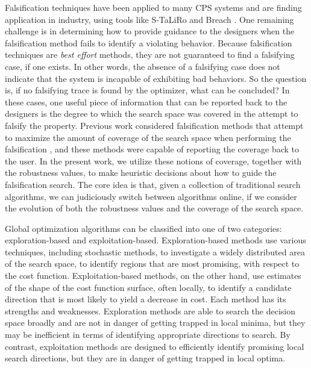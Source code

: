 Falsification techniques have been applied to many CPS systems and are finding application in industry, using tools like S-TaLiRo and Breach \cite{TaliroLFS11,BreachCAV10}.
One remaining challenge is in determining how to provide guidance to the designers when the falsification method fails to identify a violating behavior.
Because falsification techniques are \emph{best effort} methods, they are not guaranteed to find a falsifying case, if one exists.
In other words, the absence of a falsifying case does not indicate that the system is incapable of exhibiting bad behaviors.
So the question is, if no falsifying trace is found by the optimizer, what can be concluded? In these cases, one useful piece of information that can be reported back to the designers is the degree to which the search space was covered in the attempt to falsify the property.
Previous work considered falsification methods that attempt to maximize the amount of coverage of the search space when performing the falsification \cite{Dreossi2015,CAV2017}, and these methods were capable of reporting the coverage back to the user.
In the present work, we utilize these notions of coverage, together with the robustness values, to make heuristic decisions about how to guide the falsification search.
The core idea is that, given a collection of traditional search algorithms, we can judiciously switch between algorithms online, if we consider 
the evolution of both the robustness values and the coverage of the search space.


Global optimization algorithms can be classified into one of two categories: exploration-based and exploitation-based. 
Exploration-based methods use various techniques, including stochastic methods, to investigate a widely distributed area of the search space, to identify regions that are most promising, with respect to the cost function.
Exploitation-based methods, on the other hand, use estimates of the shape of the cost function surface, often locally, to identify a candidate direction that is most likely to yield a decrease in cost.
Each method has its strengths and weaknesses.
Exploration methods are able to search the decision space broadly and are not in danger of getting trapped in local minima, but they may be inefficient in terms of identifying appropriate directions to search.
By contrast, exploitation methods are designed to efficiently identify promising local search directions, but they are in danger of getting trapped in local optima.

